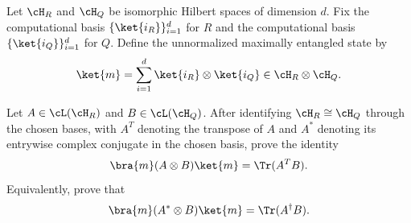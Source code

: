 Let $\cH_R$ and $\cH_Q$ be isomorphic Hilbert spaces of dimension $d$. Fix the computational basis $\{\ket{i_R}\}_{i=1}^{d}$ for $R$ and the computational basis $\{\ket{i_Q}\}_{i=1}^{d}$ for $Q$. Define the unnormalized maximally entangled state by
$$
\ket{m}
=
\sum_{i=1}^{d}
\ket{i_R}\otimes \ket{i_Q}
\in \cH_R\otimes \cH_Q.
$$

Let $A\in \cL(\cH_R)$ and $B\in \cL(\cH_Q)$. After identifying $\cH_R\cong \cH_Q$ through the chosen bases, with $A^T$ denoting the transpose of $A$ and $A^\ast$ denoting its entrywise complex conjugate in the chosen basis, prove the identity
$$
\bra{m}(A\otimes B)\ket{m}
=
\Tr(A^T B).
$$
Equivalently, prove that
$$
\bra{m}(A^\ast\otimes B)\ket{m}
=
\Tr(A^\dagger B).
$$
